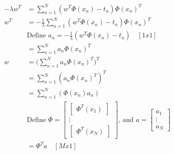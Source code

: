 \documentclass[main.tex]{subfiles}
\begin{document}
\begin{align*}
    -\lambda w^T & = \sum_{n=1}^N (w^T\Phi(x_n) - t_n) \Phi(x_n)^T                                                                                                                                      \\
    w^T          & = -\frac{1}{\lambda} \sum_{n=1}^N (w^T\Phi(x_n) - t_n) \Phi(x_n)^T                                                                                                                   \\
                 & \text{Define } a_n = -\frac{1}{\lambda} (w^T\Phi(x_n) - t_n) \quad [1x1]                                                                                                             \\
                 & = \sum_{n=1}^N a_n \Phi(x_n)^T                                                                                                                                                       \\
    w            & = \bigg( \sum_{n=1}^N a_n \Phi(x_n)^T \bigg)^T                                                                                                                                       \\
                 & = \sum_{n=1}^N (a_n \Phi(x_n)^T)^T                                                                                                                                                   \\
                 & = \sum_{n=1}^N (\Phi(x_n) a_n)                                                                                                                                                       \\
                 & \text{Define } \Phi = \begin{bmatrix}\begin{bmatrix}\Phi^T(x_1)\end{bmatrix}\\ \vdots \\ \begin{bmatrix} \Phi^T(x_N)\end{bmatrix}\end{bmatrix} \text{, and } a=\begin{bmatrix}a_1 \\ \vdots \\ a_N\end{bmatrix} \\
                 & = \Phi^T a \quad [Mx1]
\end{align*}
\end{document}
